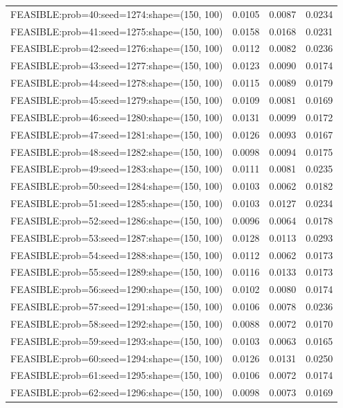\begin{longtable}{lccc}
FEASIBLE:prob=40:seed=1274:shape=(150, 100)  &   0.0105 & 0.0087 & 0.0234 \\
FEASIBLE:prob=41:seed=1275:shape=(150, 100)  &   0.0158 & 0.0168 & 0.0231 \\
FEASIBLE:prob=42:seed=1276:shape=(150, 100)  &   0.0112 & 0.0082 & 0.0236 \\
FEASIBLE:prob=43:seed=1277:shape=(150, 100)  &   0.0123 & 0.0090 & 0.0174 \\
FEASIBLE:prob=44:seed=1278:shape=(150, 100)  &   0.0115 & 0.0089 & 0.0179 \\
FEASIBLE:prob=45:seed=1279:shape=(150, 100)  &   0.0109 & 0.0081 & 0.0169 \\
FEASIBLE:prob=46:seed=1280:shape=(150, 100)  &   0.0131 & 0.0099 & 0.0172 \\
FEASIBLE:prob=47:seed=1281:shape=(150, 100)  &   0.0126 & 0.0093 & 0.0167 \\
FEASIBLE:prob=48:seed=1282:shape=(150, 100)  &   0.0098 & 0.0094 & 0.0175 \\
FEASIBLE:prob=49:seed=1283:shape=(150, 100)  &   0.0111 & 0.0081 & 0.0235 \\
FEASIBLE:prob=50:seed=1284:shape=(150, 100)  &   0.0103 & 0.0062 & 0.0182 \\
FEASIBLE:prob=51:seed=1285:shape=(150, 100)  &   0.0103 & 0.0127 & 0.0234 \\
FEASIBLE:prob=52:seed=1286:shape=(150, 100)  &   0.0096 & 0.0064 & 0.0178 \\
FEASIBLE:prob=53:seed=1287:shape=(150, 100)  &   0.0128 & 0.0113 & 0.0293 \\
FEASIBLE:prob=54:seed=1288:shape=(150, 100)  &   0.0112 & 0.0062 & 0.0173 \\
FEASIBLE:prob=55:seed=1289:shape=(150, 100)  &   0.0116 & 0.0133 & 0.0173 \\
FEASIBLE:prob=56:seed=1290:shape=(150, 100)  &   0.0102 & 0.0080 & 0.0174 \\
FEASIBLE:prob=57:seed=1291:shape=(150, 100)  &   0.0106 & 0.0078 & 0.0236 \\
FEASIBLE:prob=58:seed=1292:shape=(150, 100)  &   0.0088 & 0.0072 & 0.0170 \\
FEASIBLE:prob=59:seed=1293:shape=(150, 100)  &   0.0103 & 0.0063 & 0.0165 \\
FEASIBLE:prob=60:seed=1294:shape=(150, 100)  &   0.0126 & 0.0131 & 0.0250 \\
FEASIBLE:prob=61:seed=1295:shape=(150, 100)  &   0.0106 & 0.0072 & 0.0174 \\
FEASIBLE:prob=62:seed=1296:shape=(150, 100)  &   0.0098 & 0.0073 & 0.0169 \\

\end{longtable}
